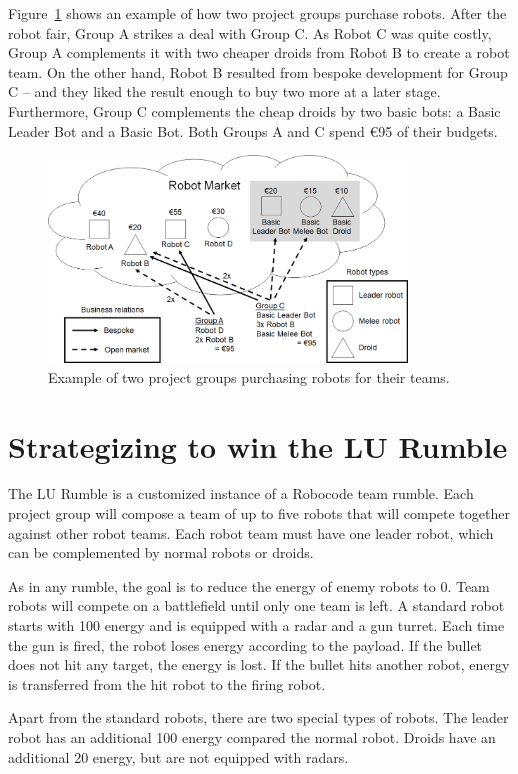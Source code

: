\documentclass{scrreprt}
\begin{document}
Figure~\ref{fig:market} shows an example of how two project groups purchase robots. After the robot fair, Group A strikes a deal with Group C. As Robot C was quite costly, Group A complements it with two cheaper droids from Robot B to create a robot team. On the other hand, Robot B resulted from bespoke development for Group C -- and they liked the result enough to buy two more at a later stage. Furthermore, Group C complements the cheap droids by two basic bots: a Basic Leader Bot and a Basic Bot. Both Groups A and C spend \euro95 of their budgets.

\begin{figure}
\centering
\includegraphics[width=0.85\textwidth]{figures/marketExample.png}
\caption{Example of two project groups purchasing robots for their teams.}
\label{fig:market}
\end{figure}

\section{Strategizing to win the LU Rumble}
The LU Rumble is a customized instance of a Robocode team rumble. Each project group will compose a team of up to five robots that will compete together against other robot teams. Each robot team must have one leader robot, which can be complemented by normal robots or droids.

As in any rumble, the goal is to reduce the energy of enemy robots to 0. Team robots will compete on a battlefield until only one team is left. A standard robot starts with 100 energy and is equipped with a radar and a gun turret. Each time the gun is fired, the robot loses energy according to the payload. If the bullet does not hit any target, the energy is lost. If the bullet hits another robot, energy is transferred from the hit robot to the firing robot.

Apart from the standard robots, there are two special types of robots. The leader robot has an additional 100 energy compared the normal robot. Droids have an additional 20 energy, but are not equipped with radars.
\end{document}
